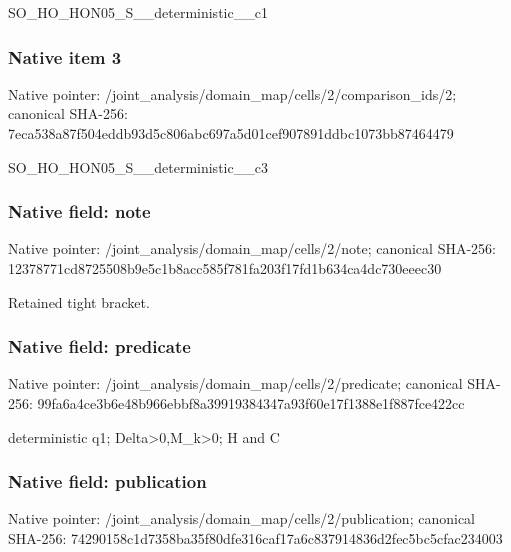 \documentclass[10pt,a4paper]{article}
\begin{document}
\begingroup\raggedright\sloppy SO\_\allowbreak{}HO\_\allowbreak{}HON05\_\allowbreak{}S\_\allowbreak{}\_\allowbreak{}deterministic\_\allowbreak{}\_\allowbreak{}c1\par\endgroup

\subsubsection{Native item 3}
Native pointer: /joint\_\allowbreak{}analysis/domain\_\allowbreak{}map/cells/2/comparison\_\allowbreak{}ids/2; canonical SHA-256: 7eca538a87f504eddb93d5c806abc697a5d01cef907891ddbc1073bb87464479

\begingroup\raggedright\sloppy SO\_\allowbreak{}HO\_\allowbreak{}HON05\_\allowbreak{}S\_\allowbreak{}\_\allowbreak{}deterministic\_\allowbreak{}\_\allowbreak{}c3\par\endgroup

\subsubsection{Native field: note}
Native pointer: /joint\_\allowbreak{}analysis/domain\_\allowbreak{}map/cells/2/note; canonical SHA-256: 12378771cd8725508b9e5c1b8acc585f781fa203f17fd1b634ca4dc730eeec30

\begingroup\raggedright\sloppy Retained tight bracket.\par\endgroup

\subsubsection{Native field: predicate}
Native pointer: /joint\_\allowbreak{}analysis/domain\_\allowbreak{}map/cells/2/predicate; canonical SHA-256: 99fa6a4ce3b6e48b966ebbf8a39919384347a93f60e17f1388e1f887fce422cc

\begingroup\raggedright\sloppy deterministic q1;\allowbreak{} Delta>0,\allowbreak{}M\_\allowbreak{}k>0;\allowbreak{} H and C\par\endgroup

\subsubsection{Native field: publication}
Native pointer: /joint\_\allowbreak{}analysis/domain\_\allowbreak{}map/cells/2/publication; canonical SHA-256: 74290158c1d7358ba35f80dfe316caf17a6c837914836d2fec5bc5cfac234003
\end{document}
